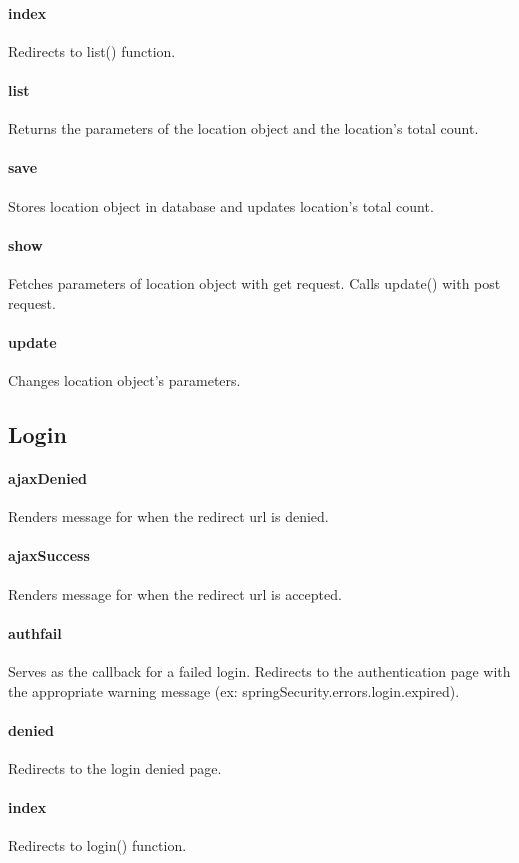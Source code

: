 \documentclass[12pt]{article}
\begin{document}
\paragraph{index} Redirects to list() function.
\paragraph{list} Returns the parameters of the location object and the location's total count.
\paragraph{save} Stores location object in database and updates location's total count.
\paragraph{show} Fetches parameters of location object with get request. Calls update() with post request.
\paragraph{update} Changes location object's parameters.

\subsection{Login}\label{sec:CLogin}
\paragraph{ajaxDenied} Renders message for when the redirect url is denied.
\paragraph{ajaxSuccess} Renders message for when the redirect url is accepted.
\paragraph{authfail} Serves as the callback for a failed login. Redirects to the authentication page with the appropriate warning message (ex: springSecurity.errors.login.expired).
\paragraph{denied} Redirects to the login denied page.
\paragraph{index} Redirects to login() function.
\end{document}
